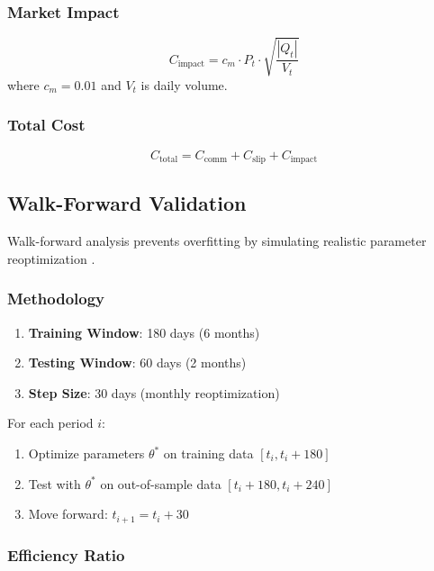 \documentclass[12pt,a4paper]{article}
\begin{document}
\subsubsection{Market Impact}
\begin{equation}
C_{\text{impact}} = c_m \cdot P_t \cdot \sqrt{\frac{|Q_t|}{V_t}}
\end{equation}
where $c_m = 0.01$ and $V_t$ is daily volume.

\subsubsection{Total Cost}
\begin{equation}
C_{\text{total}} = C_{\text{comm}} + C_{\text{slip}} + C_{\text{impact}}
\end{equation}

\subsection{Walk-Forward Validation}
\label{sec:walkforward}

Walk-forward analysis prevents overfitting by simulating realistic parameter reoptimization \citep{pardo2011evaluation}.

\subsubsection{Methodology}

\begin{enumerate}
    \item \textbf{Training Window}: 180 days (6 months)
    \item \textbf{Testing Window}: 60 days (2 months)
    \item \textbf{Step Size}: 30 days (monthly reoptimization)
\end{enumerate}

For each period $i$:
\begin{enumerate}
    \item Optimize parameters $\theta^*$ on training data $[t_i, t_i + 180]$
    \item Test with $\theta^*$ on out-of-sample data $[t_i + 180, t_i + 240]$
    \item Move forward: $t_{i+1} = t_i + 30$
\end{enumerate}

\subsubsection{Efficiency Ratio}
\end{document}
